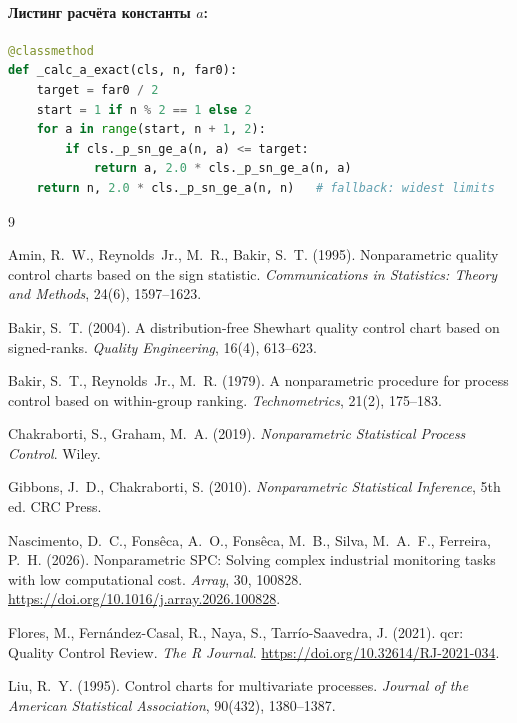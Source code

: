 \documentclass[11pt,a4paper]{article}
\begin{document}
\paragraph{Листинг расчёта константы $a$:}
\begin{lstlisting}[language=Python]
@classmethod
def _calc_a_exact(cls, n, far0):
    target = far0 / 2
    start = 1 if n % 2 == 1 else 2
    for a in range(start, n + 1, 2):
        if cls._p_sn_ge_a(n, a) <= target:
            return a, 2.0 * cls._p_sn_ge_a(n, a)
    return n, 2.0 * cls._p_sn_ge_a(n, n)   # fallback: widest limits
\end{lstlisting}

\begin{thebibliography}{9}

Amin, R.~W., Reynolds~Jr., M.~R., Bakir, S.~T. (1995).
Nonparametric quality control charts based on the sign statistic.
\emph{Communications in Statistics: Theory and Methods}, 24(6), 1597--1623.

Bakir, S.~T. (2004).
A distribution-free Shewhart quality control chart based on signed-ranks.
\emph{Quality Engineering}, 16(4), 613--623.

Bakir, S.~T., Reynolds~Jr., M.~R. (1979).
A nonparametric procedure for process control based on within-group ranking.
\emph{Technometrics}, 21(2), 175--183.

Chakraborti, S., Graham, M.~A. (2019).
\emph{Nonparametric Statistical Process Control}. Wiley.

Gibbons, J.~D., Chakraborti, S. (2010).
\emph{Nonparametric Statistical Inference}, 5th ed. CRC Press.

Nascimento, D.~C., Fons\^eca, A.~O., Fons\^eca, M.~B., Silva, M.~A.~F.,
Ferreira, P.~H. (2026).
Nonparametric SPC: Solving complex industrial monitoring tasks with low
computational cost. \emph{Array}, 30, 100828.
\url{https://doi.org/10.1016/j.array.2026.100828}.

Flores, M., Fern\'andez-Casal, R., Naya, S., Tarr\'io-Saavedra, J. (2021).
qcr: Quality Control Review. \emph{The R Journal}.
\url{https://doi.org/10.32614/RJ-2021-034}.

Liu, R.~Y. (1995).
Control charts for multivariate processes.
\emph{Journal of the American Statistical Association}, 90(432), 1380--1387.

\end{thebibliography}
\end{document}
